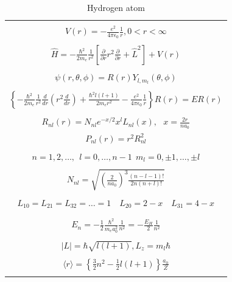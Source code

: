 \documentclass[11pt]{article}
\begin{document}
\begin{table}[]
   \begin{center}
   \caption{Hydrogen atom}
    \label{Hydrogen atom}
\begin{tabular}[h]{|c|}
\hline
 \\
$\displaystyle       V(r) = -\frac{e^2}{4\pi\epsilon_0}\frac{1}{r}, 0 < r< \infty$ \\
 \\
$\displaystyle     \hat H = -\frac{\hbar^2}{2m_e}\frac{1}{r^2}\left [
  \frac{\partial}{\partial r}r^2\frac{\partial}{\partial r} + \hat L^2 \right ] +V(r)$ \\
\\
$\displaystyle \psi(r,\theta,\phi) = R(r)Y_{l,m_l}(\theta,\phi) $ \\
\\
$\displaystyle   \left \{ -\frac{\hbar^2}{2m_e}\frac{1}{r^2}
            \frac{d}{d r} \left ( r^2 \frac{d}{dr}\right ) + \frac{\hbar^2
              l(l+1)}{2 m_e r^2}
          -\frac{e^2}{4\pi\epsilon_0}\frac{1}{r}\right \} R(r) = E R(r) $ \\
\\
$\displaystyle R_{nl}(r) = N_{nl} e^{-x/2} x^l L_{nl}(x),\ \ \  x = \frac{2 r}{n a_0} $
\\
$\displaystyle P_{nl}(r) = r^2 R_{nl}^2 $
\\
\\
$\displaystyle n = 1, 2, \ldots,\ \  l = 0, \ldots, n-1 \ \ m_l = 0,\pm 1, \ldots, \pm l$
\\
\\
$\displaystyle N_{nl} = \sqrt{\left ( \frac{2}{na_0}\right )^3 \frac{(n-l-1)!}{2n(n+l)!}}$
\\
\\
$\displaystyle L_{10} = L_{21} = L_{32} = \ldots =1 \quad L_{20} = 2 - x \quad L_{31} = 4-x$
\\
\\
\\
$\displaystyle     E_{n}=-\frac{1}{2}\frac{\hbar^2}{m_e a_0^2}\frac{1}{n^2} =-\frac{E_H}{2}\frac{1}{n^2}$ \\
 \\
$\displaystyle |L| = \hbar \sqrt{l(l+1)}, L_z = m_l \hbar $ \\
\\
$\displaystyle \langle r \rangle = \left \{ \frac{3}{2} n^2 - \frac{1}{2} l(l+1) \right \} \frac{a_0}{Z} $ \\
\\
\hline
\end{tabular}
 \end{center}
\end{table}
\end{document}
